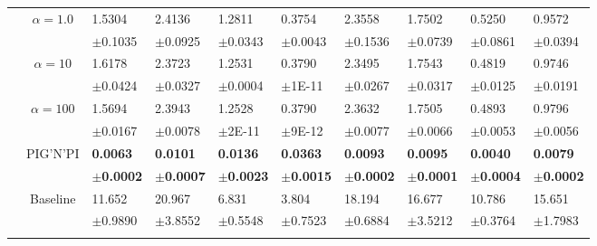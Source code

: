 \documentclass{article}
\newcommand{\pignpi}{PIG'N'PI\xspace}
\begin{document}
\begin{table}[h!]
{\begin{tabularx}{\textwidth}{ccX X X X X X X X}
        & \multirow{2}{*}{$\alpha=1.0$}
        & 1.5304 & 2.4136 & 1.2811 & 0.3754 & 2.3558 & 1.7502 & 0.5250 & 0.9572\\
        &&\scriptsize$\pm$0.1035 & \scriptsize $\pm$0.0925 & \scriptsize $\pm$0.0343 & \scriptsize $\pm$0.0043 & \scriptsize $\pm$0.1536 & \scriptsize $\pm$0.0739 & \scriptsize $\pm$0.0861 & \scriptsize $\pm$0.0394\\

        \cline{3-10}\rule{0pt}{2.3ex}
        & \multirow{2}{*}{$\alpha=10$}
        & 1.6178 & 2.3723 & 1.2531 & 0.3790 & 2.3495 & 1.7543 & 0.4819 & 0.9746\\
        &&\scriptsize$\pm$0.0424 & \scriptsize $\pm$0.0327 & \scriptsize $\pm$0.0004 & \scriptsize $\pm$1E-11 & \scriptsize $\pm$0.0267 & \scriptsize $\pm$0.0317 & \scriptsize $\pm$0.0125 & \scriptsize $\pm$0.0191\\

        \cline{3-10}\rule{0pt}{2.3ex}
        & \multirow{2}{*}{$\alpha=100$}
        & 1.5694 & 2.3943 & 1.2528 & 0.3790 & 2.3632 & 1.7505 & 0.4893 & 0.9796\\        
        &&\scriptsize$\pm$0.0167 & \scriptsize $\pm$0.0078 & \scriptsize $\pm$2E-11 & \scriptsize $\pm$9E-12 & \scriptsize $\pm$0.0077 & \scriptsize $\pm$0.0066 & \scriptsize $\pm$0.0053 & \scriptsize $\pm$0.0056\\
        
        \cline{3-10}\rule{0pt}{2.3ex}
        
        &\multirow{2}{*}{\pignpi}
        &\textbf{0.0063} & \textbf{0.0101} & \textbf{0.0136} & \textbf{0.0363} & \textbf{0.0093} & \textbf{0.0095} & \textbf{0.0040} & \textbf{0.0079}\\
        &&\scriptsize\textbf{$\pm$0.0002} & \scriptsize \textbf{$\pm$0.0007} & \scriptsize \textbf{$\pm$0.0023} & \scriptsize \textbf{$\pm$0.0015} & \scriptsize \textbf{$\pm$0.0002} & \scriptsize \textbf{$\pm$0.0001} & \scriptsize \textbf{$\pm$0.0004} & \scriptsize \textbf{$\pm$0.0002}\\
        \hline\rule{0pt}{2.3ex}
        
    
        \multirow{12}{*}{ \textsf{MAE\textsubscript{nf}}}

        &\multirow{2}{*}{Baseline}
        &11.652 & 20.967 & 6.831 & 3.804 & 18.194 & 16.677 & 10.786 & 15.651\\
        &&\scriptsize$\pm$0.9890 & \scriptsize $\pm$3.8552 & \scriptsize $\pm$0.5548 & \scriptsize $\pm$0.7523 & \scriptsize $\pm$0.6884 & \scriptsize $\pm$3.5212 & \scriptsize $\pm$0.3764 & \scriptsize $\pm$1.7983\\
        \cline{3-10}\rule{0pt}{2.3ex}


\end{tabularx}}
\end{table}
\end{document}
